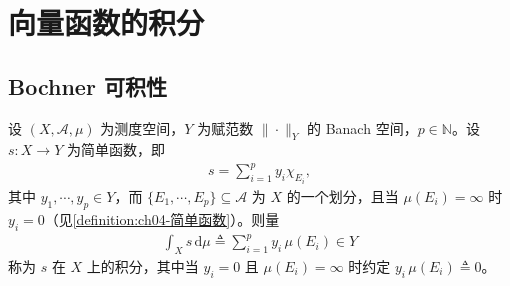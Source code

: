 \documentclass[../../main.tex]{subfiles}%
\begin{document}
\section{向量函数的积分}\label{section:ch04-积分}

\subsection{Bochner 可积性}\label{subsection:ch04-Bochner可积}

\begin{definition}[简单函数的积分]\label{definition:ch04-简单函数积分}
设 $(X,\mathcal{A},\mu)$ 为测度空间，$Y$ 为赋范数 $\|\cdot\|_Y$ 的 Banach 空间，$p\in\mathbb{N}$。设 $s:X\to Y$ 为简单函数，即
\begin{align*}
s=\sum_{i=1}^p y_i\chi_{E_i},
\end{align*}
其中 $y_1,\cdots ,y_p\in Y$，而 $\{E_1,\cdots ,E_p\}\subseteq\mathcal{A}$ 为 $X$ 的一个划分，且当 $\mu(E_i)=\infty$ 时 $y_i=0$（见\cref{definition:ch04-简单函数}）。则量
\begin{align*}
\int_X s\,\mathrm{d}\mu\triangleq \sum_{i=1}^p y_i\,\mu(E_i)\in Y
\end{align*}
称为 $s$ 在 $X$ 上的积分，其中当 $y_i=0$ 且 $\mu(E_i)=\infty$ 时约定 $y_i\,\mu(E_i)\triangleq 0$。
\end{definition}
\end{document}
